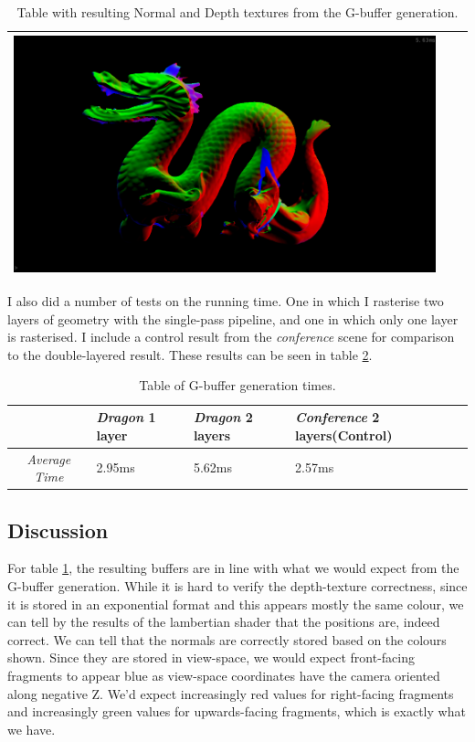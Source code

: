 \begin{table}[!ht]
\begin{tabular}{| c | c | c |}
\includegraphics[scale=0.1,trim=0 0 0 -5]{img/results/g-buffer/normals-2layer-2} \\
\hline
\end{tabular}
\caption{Table with resulting Normal and Depth textures from the G-buffer generation.}
\label{table-buffers}
\end{table}

I also did a number of tests on the running time. One in which I rasterise two layers of geometry with the single-pass pipeline, and one in which only one layer is rasterised. I include a control result from the \emph{conference} scene for comparison to the double-layered result. These results can be seen in table \ref{table-gbuffer-time}.

\begin{table}[!ht]
\centering
\begin{tabular}{| c | p{2.5cm} | p{2.5cm} | p{2.5cm} |}
\hline
 & \emph{Dragon} 1 layer & \emph{Dragon} 2 layers & \emph{Conference} 2 layers\newline (Control) \\
\hline
\emph{Average Time} & 2.95ms & 5.62ms & 2.57ms \\
\hline
\end{tabular}
\caption{Table of G-buffer generation times.}
\label{table-gbuffer-time}
\end{table}

\subsection{Discussion}
For table \ref{table-buffers}, the resulting buffers are in line with what we would expect from the G-buffer generation. While it is hard to verify the depth-texture correctness, since it is stored in an exponential format and this appears mostly the same colour, we can tell by the results of the lambertian shader that the positions are, indeed correct. We can tell that the normals are correctly stored based on the colours shown. Since they are stored in view-space, we would expect front-facing fragments to appear blue as view-space coordinates have the camera oriented along negative Z. We'd expect increasingly red values for right-facing fragments and increasingly green values for upwards-facing fragments, which is exactly what we have.

